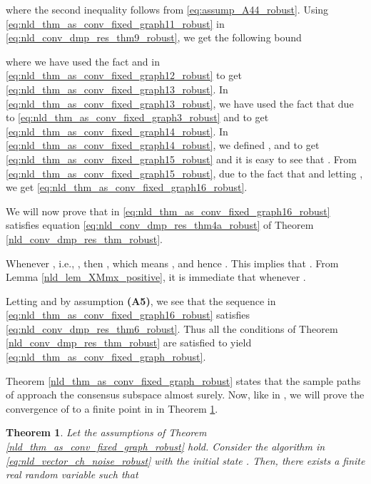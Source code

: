 \documentclass[onecolumn, draft, 12pt]{IEEEtran}
\newtheorem{thm}{Theorem}
\begin{document}
\begin{IEEEproof}
where the second inequality follows from \eqref{eq:assump_A44_robust}. Using \eqref{eq:nld_thm_as_conv_fixed_graph11_robust} in \eqref{eq:nld_conv_dmp_res_thm9_robust}, we get the following bound

where we have used the fact  and  in \eqref{eq:nld_thm_as_conv_fixed_graph12_robust} to get \eqref{eq:nld_thm_as_conv_fixed_graph13_robust}. In \eqref{eq:nld_thm_as_conv_fixed_graph13_robust}, we have used the fact that  due to  \eqref{eq:nld_thm_as_conv_fixed_graph3_robust} and  to get \eqref{eq:nld_thm_as_conv_fixed_graph14_robust}. In \eqref{eq:nld_thm_as_conv_fixed_graph14_robust}, we defined  , and  to get \eqref{eq:nld_thm_as_conv_fixed_graph15_robust} and it is easy to see that . From  \eqref{eq:nld_thm_as_conv_fixed_graph15_robust}, due to the fact that  and letting , we get \eqref{eq:nld_thm_as_conv_fixed_graph16_robust}.

We will now prove that  in \eqref{eq:nld_thm_as_conv_fixed_graph16_robust} satisfies equation \eqref{eq:nld_conv_dmp_res_thm4a_robust} of Theorem \ref{nld_conv_dmp_res_thm_robust}.

Whenever , i.e., , then , which means , and hence . This implies that . From Lemma \ref{nld_lem_XMmx_positive}, it is immediate that  whenever . 

Letting  and by assumption \textbf{(A5)}, we see that the sequence  in \eqref{eq:nld_thm_as_conv_fixed_graph16_robust} satisfies \eqref{eq:nld_conv_dmp_res_thm6_robust}. Thus all the conditions of Theorem \ref{nld_conv_dmp_res_thm_robust} are satisfied to yield \eqref{eq:nld_thm_as_conv_fixed_graph_robust}.
\end{IEEEproof}

Theorem \ref{nld_thm_as_conv_fixed_graph_robust} states that the sample paths of  approach the consensus subspace almost surely. Now, like in \cite{KarMoura2009}, we will prove the convergence of  to a finite point in  in Theorem \ref{nld_conv_as_limiting_rv_robust}. 

\begin{thm} \label{nld_conv_as_limiting_rv_robust}
Let the assumptions of Theorem \ref{nld_thm_as_conv_fixed_graph_robust} hold. Consider the  algorithm in \eqref{eq:nld_vector_ch_noise_robust} with the initial state . Then, there exists a finite real random variable  such that



\end{thm}
\end{document}
